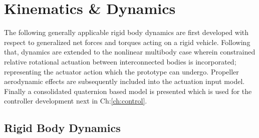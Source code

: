 \chapter{Kinematics \& Dynamics}
\label{ch:dynamics}
The following generally applicable rigid body dynamics are first developed with respect to generalized net forces and torques acting on a rigid vehicle. Following that, dynamics are extended to the nonlinear multibody case wherein constrained relative rotational actuation between interconnected bodies is incorporated; representing the actuator action which the prototype can undergo. Propeller aerodynamic effects are subsequently included into the actuation input model. Finally a consolidated quaternion based model is presented which is used for the controller development next in Ch:\ref{ch:control}.
\section{Rigid Body Dynamics}
\label{sec:dynamics.rigidbody}
